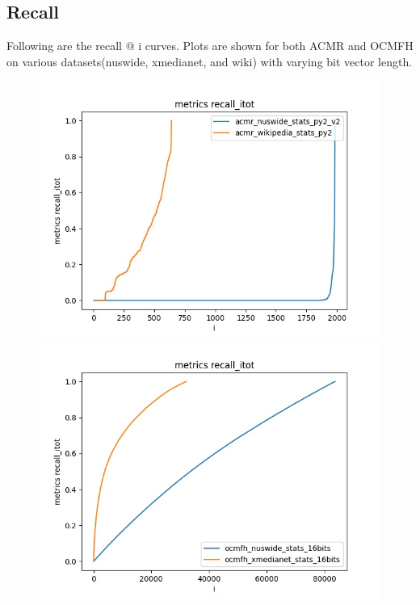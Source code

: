 \newpage
\subsection{Recall}
    Following are the recall @ i curves. Plots are shown for both ACMR\cite{acmr} and OCMFH\cite{ocmfh} on various datasets(nuswide, xmedianet, and wiki) with varying bit vector length.
        \begin{figure}[H]
            \begin{minipage}[!h]{0.5\linewidth}
                \centering
                \includegraphics[width=\linewidth]{resultsImages/recall/metrics recall_itot_acmr_both.jpeg}
            \end{minipage}
            \begin{minipage}[!h]{0.5\linewidth}
                \centering
                \includegraphics[width=\linewidth]{resultsImages/recall/metrics recall_itot_ocmfh_both.jpeg}

\end{minipage}
\end{figure}
